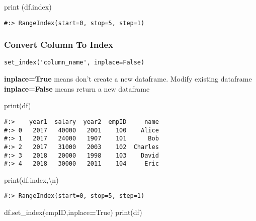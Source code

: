 \documentclass[
]{book}
\newenvironment{Shaded}{\begin{snugshade}}{\end{snugshade}}
\newcommand{\BuiltInTok}[1]{#1}
\newcommand{\CharTok}[1]{\textcolor[rgb]{0.5,0.5,0.5}{#1}}
\newcommand{\NormalTok}[1]{#1}
\newcommand{\OperatorTok}[1]{\textcolor[rgb]{0.43,0.43,0.43}{\textbf{#1}}}
\newcommand{\StringTok}[1]{\textcolor[rgb]{0.5,0.5,0.5}{#1}}
\newcommand{\VariableTok}[1]{\textcolor[rgb]{0,0,0}{#1}}
\begin{document}
\begin{Shaded}
\begin{Highlighting}[]
\BuiltInTok{print}\NormalTok{ (df.index)}
\end{Highlighting}
\end{Shaded}

\begin{verbatim}
#:> RangeIndex(start=0, stop=5, step=1)
\end{verbatim}

\hypertarget{convert-column-to-index}{%
\subsubsection{Convert Column To Index}\label{convert-column-to-index}}

\begin{verbatim}
set_index('column_name', inplace=False)
\end{verbatim}

\textbf{inplace=True} means don't create a new dataframe. Modify existing dataframe\\
\textbf{inplace=False} means return a new dataframe

\begin{Shaded}
\begin{Highlighting}[]
\BuiltInTok{print}\NormalTok{(df)}
\end{Highlighting}
\end{Shaded}

\begin{verbatim}
#:>    year1  salary  year2  empID     name
#:> 0   2017   40000   2001    100    Alice
#:> 1   2017   24000   1907    101      Bob
#:> 2   2017   31000   2003    102  Charles
#:> 3   2018   20000   1998    103    David
#:> 4   2018   30000   2011    104     Eric
\end{verbatim}

\begin{Shaded}
\begin{Highlighting}[]
\BuiltInTok{print}\NormalTok{(df.index,}\StringTok{\textquotesingle{}}\CharTok{\textbackslash{}n}\StringTok{\textquotesingle{}}\NormalTok{)}
\end{Highlighting}
\end{Shaded}

\begin{verbatim}
#:> RangeIndex(start=0, stop=5, step=1)
\end{verbatim}

\begin{Shaded}
\begin{Highlighting}[]
\NormalTok{df.set\_index(}\StringTok{\textquotesingle{}empID\textquotesingle{}}\NormalTok{,inplace}\OperatorTok{=}\VariableTok{True}\NormalTok{) }
\BuiltInTok{print}\NormalTok{(df)}
\end{Highlighting}
\end{Shaded}
\end{document}
